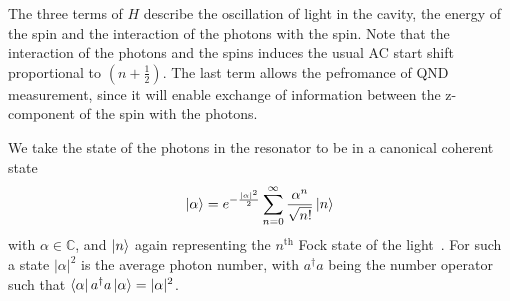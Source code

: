 The three terms of $H$ describe the oscillation of light in the cavity, the energy
of the spin and the interaction of the photons with the spin. Note that the
interaction of the photons and the spins induces the usual AC start shift
proportional to $(n+\frac{1}{2})$. The last term allows the pefromance of 
QND measurement, since it will enable exchange of information
between the z-component of the spin with the photons.

We take the state of the photons in the resonator to be in a canonical coherent
state~\cite{Gazeau2009}
%
\begin{equation}
  \ket{\alpha} = e^{-\frac{|\alpha|^2}{2}}\sum_{n=0}^\infty \frac{\alpha^n}{\sqrt{n!}} \ket{n}
\end{equation}
%
with $\alpha\in\mathbb{C}$, and $\ket{n}$ again representing the $n^\text{th}$
Fock state of the light~\cite{agarwal2012}. For such a state $|\alpha|^2$ is
the average photon number, with $a^\dagger a$ being the number operator such
that $\bra{\alpha}a^\dagger a \ket{\alpha} = |\alpha|^2$.

